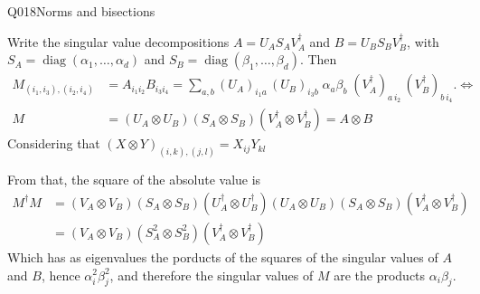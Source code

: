 \begin{entry}{Q018}{Norms and bisections}
\begin{solution}[a]
\begin{center}
\end{center}

Write the singular value decompositions $A=U_A S_A V_A^{\dagger}$ and
$B=U_B S_B V_B^{\dagger}$, with $S_A=\operatorname{diag}(\alpha_1,\dots,\alpha_d)$ and
$S_B=\operatorname{diag}(\beta_1,\dots,\beta_d)$. Then
\begin{equation}
\begin{split}
     M_{(i_1,i_3),(i_2,i_4)} &= A_{i_1 i_2}B_{i_3 i_4}
     = \sum_{a,b} (U_A)_{i_1 a}\,(U_B)_{i_3 b}\;\alpha_a\beta_b\;(V_A^{\dagger})_{a\,i_2}\,(V_B^{\dagger})_{b\,i_4}. \iff \\ 
     M &= (U_A \otimes U_B)(S_A\otimes S_B)(V^\dagger_A \otimes V^\dagger_B) = A\otimes B
\end{split}
\label{M_partition2}
\end{equation}
Considering that $(X\otimes Y)_{(i,k),(j,l)}=X_{ij}Y_{kl}$

From that, the square of the absolute value is
\begin{equation}
\begin{split} 
     M^\dagger M &= (V_A \otimes V_B)(S_A\otimes S_B)(U^\dagger_A \otimes U^\dagger_B) (U_A \otimes U_B)(S_A\otimes S_B)(V^\dagger_A \otimes V^\dagger_B) \\
     &= (V_A \otimes V_B)(S_A^2\otimes S_B^2)(V^\dagger_A \otimes V^\dagger_B)
\end{split}
\label{M_partition2}
\end{equation}
Which has as eigenvalues the porducts of the squares of the singular values of $A$ and $B$, hence $\alpha^2_i\beta^2_j$, and therefore the singular values of $M$ are the products $\alpha_i\beta_j$.


\end{solution}
\end{entry}
